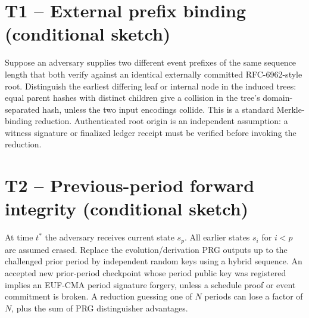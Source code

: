 \section*{T1 -- External prefix binding (conditional sketch)}
Suppose an adversary supplies two different event prefixes of the same
sequence length that both verify against an identical externally committed
RFC-6962-style root. Distinguish the earliest differing leaf or internal node
in the induced trees: equal parent hashes with distinct children give a
collision in the tree's domain-separated hash, unless the two input encodings
collide. This is a standard Merkle-binding reduction. Authenticated root
origin is an independent assumption: a witness signature or finalized ledger
receipt must be verified before invoking the reduction.

\section*{T2 -- Previous-period forward integrity (conditional sketch)}
At time $t^*$ the adversary receives current state $s_p$. All earlier
states $s_i$ for $i<p$ are assumed erased. Replace the evolution/derivation
PRG outputs up to the challenged prior period by independent random keys
using a hybrid sequence. An accepted new prior-period checkpoint whose
period public key was registered implies an EUF-CMA period signature forgery,
unless a schedule proof or event commitment is broken. A reduction guessing
one of $N$ periods can lose a factor of $N$, plus the sum of PRG distinguisher
advantages.
